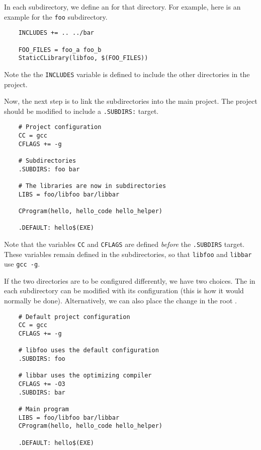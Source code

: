 In each subdirectory, we define an  for that directory.  For example, here
is an example  for the \verb+foo+ subdirectory.

\begin{verbatim}
    INCLUDES += .. ../bar

    FOO_FILES = foo_a foo_b
    StaticCLibrary(libfoo, $(FOO_FILES))
\end{verbatim}

Note the the \verb+INCLUDES+ variable is defined to include the other directories in the project.

Now, the next step is to link the subdirectories into the main project.  The project 
should be modified to include a \verb+.SUBDIRS:+ target.

\begin{verbatim}
    # Project configuration
    CC = gcc
    CFLAGS += -g

    # Subdirectories
    .SUBDIRS: foo bar

    # The libraries are now in subdirectories
    LIBS = foo/libfoo bar/libbar

    CProgram(hello, hello_code hello_helper)

    .DEFAULT: hello$(EXE)
\end{verbatim}

Note that the variables \verb+CC+ and \verb+CFLAGS+ are defined \emph{before} the \verb+.SUBDIRS+
target.  These variables remain defined in the subdirectories, so that \verb+libfoo+ and \verb+libbar+
use \verb+gcc -g+.

If the two directories are to be configured differently, we have two choices.  The 
in each subdirectory can be modified with its configuration (this is how it would normally be done).
Alternatively, we can also place the change in the root .

\begin{verbatim}
    # Default project configuration
    CC = gcc
    CFLAGS += -g

    # libfoo uses the default configuration
    .SUBDIRS: foo

    # libbar uses the optimizing compiler
    CFLAGS += -O3
    .SUBDIRS: bar

    # Main program
    LIBS = foo/libfoo bar/libbar
    CProgram(hello, hello_code hello_helper)

    .DEFAULT: hello$(EXE)
\end{verbatim}

